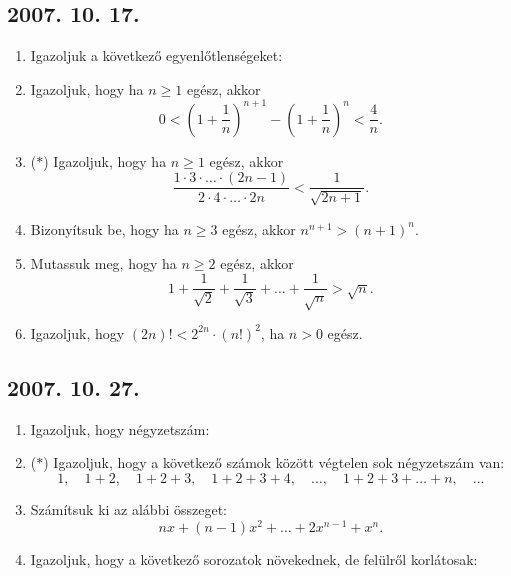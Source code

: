 \subsection*{2007. 10. 17.}
\begin{enumerate}
\item Igazoljuk a következő egyenlőtlenségeket:
\item Igazoljuk, hogy ha $n \ge 1$ egész, akkor
$$0<\left(1+\frac{1}{n}\right)^{n+1}-
\left(1+\frac{1}{n}\right)^n<\frac{4}{n}.$$
\item ($*$) Igazoljuk, hogy ha $n \ge 1$ egész, akkor
$$\frac{1\cdot 3\cdot \ldots \cdot (2n-1)}{2\cdot 4\cdot \ldots \cdot 2n} < \frac{1}{\sqrt{2n+1}}.$$
\item  Bizonyítsuk be, hogy ha $n \ge 3$ egész, 
akkor $n^{n+1} > (n+1)^n$. 
\item Mutassuk meg, hogy ha $n \ge 2$ egész, akkor
$$1+\frac{1}{\sqrt{2}}+\frac{1}{\sqrt{3}}+
\ldots+\frac{1}{\sqrt{n}} > \sqrt{n}.$$
\item Igazoljuk, 
hogy $\left(2n\right)!
<2^{2n}\cdot \left(n!\right)^2$, ha $n > 0$ egész.
\end{enumerate}

\subsection*{2007. 10. 27.}
\begin{enumerate}
\item Igazoljuk, hogy négyzetszám:
\item ($*$) Igazoljuk, hogy a következő számok között végtelen sok négyzetszám van:
$$1, \quad 
1+2, \quad
1+2+3, \quad
1+2+3+4, \quad
\ldots, \quad
1+2+3+\ldots+n, \quad
\ldots $$
\item Számítsuk ki az alábbi összeget:
$$nx+(n-1)x^2+\ldots+2x^{n-1}+x^n.$$
\item Igazoljuk, hogy a következő sorozatok növekednek, de felülről korlátosak:
\end{enumerate}

